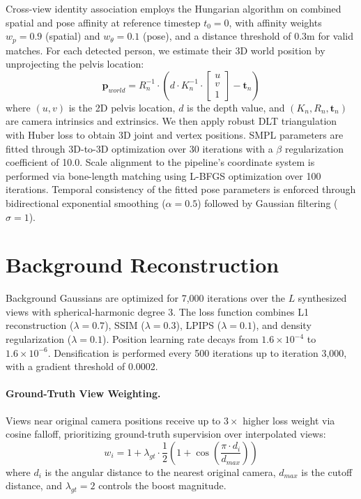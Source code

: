 \documentclass[acmtog]{acmart}
\begin{document}
Cross-view identity association employs the Hungarian algorithm on combined spatial and pose affinity at reference timestep $t_0 = 0$, with affinity weights $w_p = 0.9$ (spatial) and $w_\theta = 0.1$ (pose), and a distance threshold of 0.3m for valid matches. For each detected person, we estimate their 3D world position by unprojecting the pelvis location:
\begin{equation}
\mathbf{p}_{world} = R_n^{-1} \cdot \left( d \cdot K_n^{-1} \cdot \begin{bmatrix} u \\ v \\ 1 \end{bmatrix} - \mathbf{t}_n \right)
\end{equation}
where $(u, v)$ is the 2D pelvis location, $d$ is the depth value, and $(K_n, R_n, \mathbf{t}_n)$ are camera intrinsics and extrinsics. We then apply robust DLT triangulation with Huber loss to obtain 3D joint and vertex positions.
SMPL parameters are fitted through 3D-to-3D optimization over 30 iterations with a $\beta$ regularization coefficient of 10.0.
Scale alignment to the pipeline's coordinate system is performed via bone-length matching using L-BFGS optimization over 100 iterations.
Temporal consistency of the fitted pose parameters is enforced through bidirectional exponential smoothing ($\alpha = 0.5$) followed by Gaussian filtering ($\sigma = 1$).

\section{Background Reconstruction}
\label{sec:appendix_background}

Background Gaussians are optimized for 7,000 iterations over the $L$ synthesized views with spherical-harmonic degree 3.
The loss function combines L1 reconstruction ($\lambda = 0.7$), SSIM ($\lambda = 0.3$), LPIPS ($\lambda = 0.1$), and density regularization ($\lambda = 0.1$).
Position learning rate decays from $1.6 \times 10^{-4}$ to $1.6 \times 10^{-6}$.
Densification is performed every 500 iterations up to iteration 3,000, with a gradient threshold of 0.0002.

\paragraph{Ground-Truth View Weighting.}
Views near original camera positions receive up to $3\times$ higher loss weight via cosine falloff, prioritizing ground-truth supervision over interpolated views:
\begin{equation}
w_i = 1 + \lambda_{gt} \cdot \frac{1}{2}\left(1 + \cos\left(\frac{\pi \cdot d_i}{d_{max}}\right)\right)
\end{equation}
where $d_i$ is the angular distance to the nearest original camera, $d_{max}$ is the cutoff distance, and $\lambda_{gt} = 2$ controls the boost magnitude.
\end{document}
